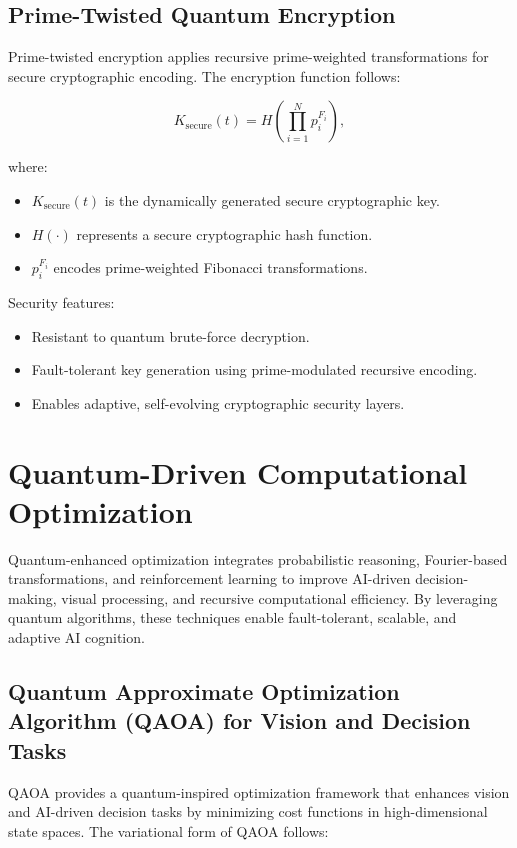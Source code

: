 \documentclass{article}
\theoremstyle{plain}
\begin{document}
\subsection{Prime-Twisted Quantum Encryption}

Prime-twisted encryption applies recursive prime-weighted transformations for secure cryptographic encoding. The encryption function follows:

\begin{equation}
K_{\text{secure}}(t) = H \left(\prod_{i=1}^{N} p_i^{F_i} \right),
\end{equation}

where:
\begin{itemize}
    \item $K_{\text{secure}}(t)$ is the dynamically generated secure cryptographic key.
    \item $H(\cdot)$ represents a secure cryptographic hash function.
    \item $p_i^{F_i}$ encodes prime-weighted Fibonacci transformations.
\end{itemize}

Security features:
\begin{itemize}
    \item Resistant to quantum brute-force decryption.
    \item Fault-tolerant key generation using prime-modulated recursive encoding.
    \item Enables adaptive, self-evolving cryptographic security layers.
\end{itemize}


\section{Quantum-Driven Computational Optimization}

Quantum-enhanced optimization integrates probabilistic reasoning, Fourier-based transformations, and reinforcement learning to improve AI-driven decision-making, visual processing, and recursive computational efficiency. By leveraging quantum algorithms, these techniques enable fault-tolerant, scalable, and adaptive AI cognition.

\subsection{Quantum Approximate Optimization Algorithm (QAOA) for Vision and Decision Tasks}

QAOA provides a quantum-inspired optimization framework that enhances vision and AI-driven decision tasks by minimizing cost functions in high-dimensional state spaces. The variational form of QAOA follows:
\end{document}
